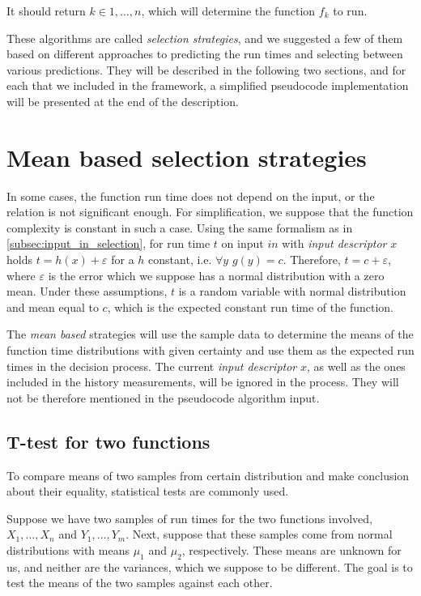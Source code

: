 It should return $k \in {1,\dots,n}$, which will determine the function $f_k$ to run.

These algorithms are called \textit{selection strategies}, and we suggested a few of them based on different approaches to predicting the run times and selecting between various predictions. They will be described in the following two sections, and for each that we included in the framework, a simplified pseudocode implementation will be presented at the end of the description.

\section{Mean based selection strategies}
\label{sec:mean_based_strategies}

In some cases, the function run time does not depend on the input, or the relation is not significant enough. For simplification, we suppose that the function complexity is constant in such a case. Using the same formalism as in \ref{subsec:input_in_selection}, for run time $t$ on input $in$ with \textit{input descriptor} $x$ holds \(t = h(x) + \varepsilon\) for a $h$ constant, i.e. $\forall y$ $g(y) = c$. Therefore, $t = c + \varepsilon$, where $\varepsilon$ is the error which we suppose has a normal distribution with a zero mean. Under these assumptions, $t$ is a random variable with normal distribution and mean equal to $c$, which is the expected constant run time of the function.

The \textit{mean based} strategies will use the sample data to determine the means of the function time distributions with given certainty and use them as the expected run times in the decision process. The current \textit{input descriptor} $x$, as well as the ones included in the history measurements, will be ignored in the process. They will not be therefore mentioned in the pseudocode algorithm input.

\subsection{T-test for two functions}
\label{subsec:t_test_two}

To compare means of two samples from certain distribution and make conclusion about their equality, statistical tests are commonly used.

Suppose we have two samples of run times for the two functions involved, $X_1,\dots, X_n$ and $Y_1,\dots, Y_m$. Next, suppose that these samples come from normal distributions with means $\mu_1$ and $\mu_2$, respectively. These means are unknown for us, and neither are the variances, which we suppose to be different. The goal is to test the means of the two samples against each other.


